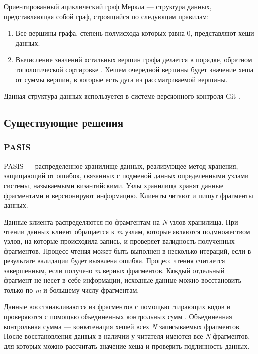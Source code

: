 Ориентированный ациклический граф Меркла \cite{merkledag} --- структура данных, представляющая собой граф, строящийся по следующим правилам:
\begin{enumerate}
	\item Все вершины графа, степень полуисхода \cite{graphs} которых равна 0, представляют хеши данных.
	\item Вычисление значений остальных вершин графа делается в порядке, обратном топологической сортировке \cite{topsort}. Хешем очередной вершины будет значение хеша от суммы вершин, в которые есть дуга из рассматриваемой вершины.
\end{enumerate}

%
Данная структура данных используется в системе версионного контроля Git \cite{git}.

\subsection{Существующие решения}

\label{par:mainanal}

\subsubsection{PASIS}

\label{par:pasis}

PASIS \cite{pasis} --- распределенное хранилище данных, реализующее метод хранения, защищающий от ошибок, связанных с подменой данных определенными узлами системы, называемыми византийскими. Узлы хранилища хранят данные фрагментами и версионируют информацию. Клиенты читают и пишут фрагменты данных.

Данные клиента распределяются по фрамгентам на \textit{N} узлов хранилища. При чтении данных клиент обращается к \textit{m} узлам, которые являются подмножеством узлов, на которые происходила запись, и проверяет валидность полученных фрагментов. Процесс чтения может быть выполнен в несколько итераций, если в результате валидации будет выявлена ошибка. Процесс чтения считается завершенным, если получено \textit{m} верных фрагментов. Каждый отдельный фрагмент не несет в себе информации, исходные данные можно восстановить только по \textit{m} и большему числу фрагментам.

Данные восстанавливаются из фрагментов с помощью стирающих кодов \cite{erasurecode} и проверяются с помощью объединенных контрольных сумм \cite{pasis}. Объединенная контрольная сумма --- конкатенация хешей всех \textit{N} записываемых фрагментов. После восстановления данных в наличии у читателя имеются все \textit{N} фрагментов, для которых можно рассчитать значение хеша и проверить подлинность данных.

